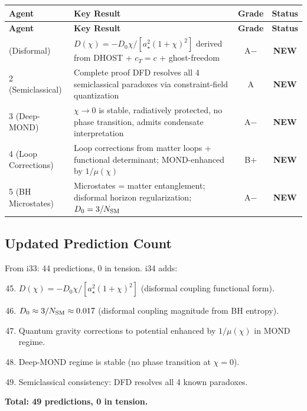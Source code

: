 \documentclass[11pt,a4paper]{article}
\newcommand{\NEW}{\textcolor{dfdblue}{\textbf{NEW}}}
\begin{document}
\begin{center}
\begin{longtable}{lp{6cm}cc}
\toprule
\textbf{Agent} & \textbf{Key Result} & \textbf{Grade} & \textbf{Status} \\
\midrule
\endfirsthead
\midrule
\textbf{Agent} & \textbf{Key Result} & \textbf{Grade} & \textbf{Status} \\
\midrule
\endhead
\bottomrule
\endlastfoot
1 (Disformal) & $D(\chi) = -D_0\chi/[a_\star^2(1+\chi)^2]$ derived from DHOST + $c_T = c$ + ghost-freedom & A$-$ & \NEW \\
2 (Semiclassical) & Complete proof DFD resolves all 4 semiclassical paradoxes via constraint-field quantization & A & \NEW \\
3 (Deep-MOND) & $\chi \to 0$ is stable, radiatively protected, no phase transition, admits condensate interpretation & A$-$ & \NEW \\
4 (Loop Corrections) & Loop corrections from matter loops + functional determinant; MOND-enhanced by $1/\mu(\chi)$ & B+ & \NEW \\
5 (BH Microstates) & Microstates = matter entanglement; disformal horizon regularization; $D_0 = 3/N_{\rm SM}$ & A$-$ & \NEW \\
\end{longtable}
\end{center}

\subsection{Updated Prediction Count}

From i33: 44 predictions, 0 in tension. i34 adds:
\begin{enumerate}
\setcounter{enumi}{44}
\item $D(\chi) = -D_0\chi/[a_\star^2(1+\chi)^2]$ (disformal coupling functional form).
\item $D_0 \approx 3/N_{\rm SM} \approx 0.017$ (disformal coupling magnitude from BH entropy).
\item Quantum gravity corrections to potential enhanced by $1/\mu(\chi)$ in MOND regime.
\item Deep-MOND regime is stable (no phase transition at $\chi = 0$).
\item Semiclassical consistency: DFD resolves all 4 known paradoxes.
\end{enumerate}

\textbf{Total: 49 predictions, 0 in tension.}
\end{document}
